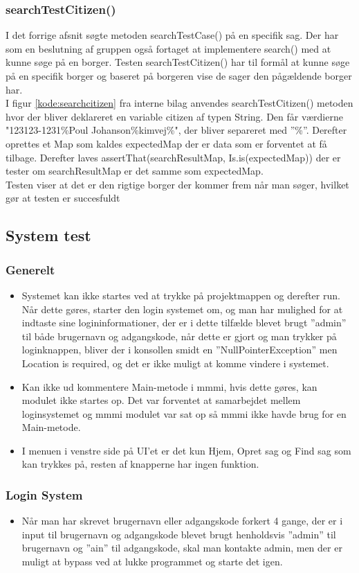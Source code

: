 \subsubsection{searchTestCitizen()}
I det forrige  afsnit søgte metoden searchTestCase() på en specifik sag. Der har som en beslutning af gruppen også fortaget at implementere search() med at kunne søge på en borger. Testen searchTestCitizen() har til formål at kunne søge på en specifik borger og baseret på borgeren vise de sager den pågældende borger har. \\
I figur \ref{kode:searchcitizen} fra interne bilag anvendes searchTestCitizen() metoden hvor der bliver deklareret en variable citizen af typen String. Den får værdierne "123123-1231\%Poul Johanson\%kimvej\%", der bliver separeret med ”\%”. Derefter oprettes et Map som kaldes expectedMap der er data som er forventet at få tilbage. Derefter laves assertThat(searchResultMap, Is.is(expectedMap)) der er tester om searchResultMap er det samme som expectedMap. \\
Testen viser at det er den rigtige borger der kommer frem når man søger, hvilket gør at testen er succesfuldt 
\subsection{System test}
\subsubsection{Generelt}
\begin{itemize}
\item Systemet kan ikke startes ved at trykke på projektmappen og derefter run. Når dette gøres, starter den login systemet om, og man har mulighed for at indtaste sine logininformationer, der er i dette tilfælde blevet brugt ”admin” til både brugernavn og adgangskode, når dette er gjort og man trykker på loginknappen, bliver der i konsollen smidt en ”NullPointerException” men Location is required, og det er ikke muligt at komme vindere i systemet.
\item Kan ikke ud kommentere Main-metode i mmmi, hvis dette gøres, kan modulet ikke startes op. Det var forventet at samarbejdet mellem loginsystemet og mmmi modulet var sat op så mmmi ikke havde brug for en Main-metode.
\item I menuen i venstre side på UI’et er det kun Hjem, Opret sag og Find sag som kan trykkes på, resten af knapperne har ingen funktion.
\end{itemize}
\subsubsection{Login System}
\begin{itemize}
\item Når man har skrevet brugernavn eller adgangskode forkert 4 gange, der er i input til brugernavn og adgangskode blevet brugt henholdsvis ”admin” til brugernavn og ”ain” til adgangskode, skal man kontakte admin, men der er muligt at bypass ved at lukke programmet og starte det igen.
\end{itemize}
